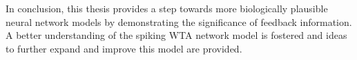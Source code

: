 In conclusion, this thesis provides a step towards more biologically plausible neural network models by demonstrating the significance of feedback information. A better understanding of the spiking WTA network model is fostered and ideas to further expand and improve this model are provided.

